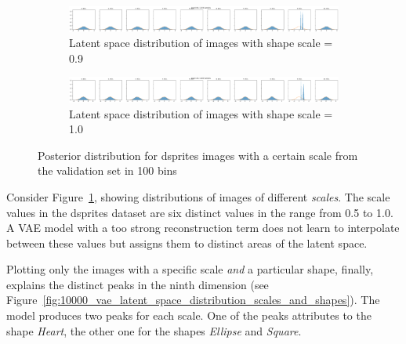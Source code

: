 \begin{figure}
    \begin{subfigure}{\textwidth}
        \centering
        \includegraphics[width=\textwidth]{images/latent_space_entanglement/vae_dsprites_lf_10000_dist_scale_0_9.png}
        \caption{Latent space distribution of images with shape scale = 0.9}
    \end{subfigure}
    \begin{subfigure}{\textwidth}
        \centering
        \includegraphics[width=\textwidth]{images/latent_space_entanglement/vae_dsprites_lf_10000_dist_scale_1_0.png}
        \caption{Latent space distribution of images with shape scale = 1.0}
    \end{subfigure}
    \caption[VAE Latent Space Distribution - dsprites Scales]{Posterior distribution for dsprites images with a certain scale from the validation set in 100 bins}
    \label{fig:10000_vae_latent_space_distribution_scales}
\end{figure}

Consider Figure~\ref{fig:10000_vae_latent_space_distribution_scales}, showing distributions of images of different \textit{scales}.
The scale values in the dsprites dataset are six distinct values in the range from 0.5 to 1.0.
A \ac{VAE} model with a too strong reconstruction term does not learn to interpolate between these values but assigns them to distinct areas of the latent space.

Plotting only the images with a specific scale \textit{and} a particular shape, finally, explains the distinct peaks in the ninth dimension (see Figure~\ref{fig:10000_vae_latent_space_distribution_scales_and_shapes}).
The model produces two peaks for each scale.
One of the peaks attributes to the shape \textit{Heart}, the other one for the shapes \textit{Ellipse} and \textit{Square}.

